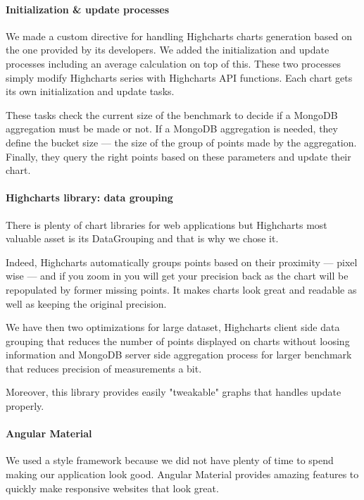 \documentclass[a4paper,11pt]{report}
\begin{document}
\paragraph{Initialization \& update processes}

We made a custom directive for handling Highcharts charts generation based on the one provided by its developers. We added the initialization and update processes including an average calculation on top of this. These two processes simply modify Highcharts series with Highcharts API functions. Each chart gets its own initialization and update tasks.

These tasks check the current size of the benchmark to decide if a MongoDB aggregation must be made or not. If a MongoDB aggregation is needed, they define the bucket size --- the size of the group of points made by the aggregation. Finally, they query the right points based on these parameters and update their chart.

\paragraph{Highcharts library: data grouping}\label{data_grouping} There is plenty of chart libraries for web applications but Highcharts most valuable asset is its DataGrouping and that is why we chose it.

Indeed, Highcharts automatically groups points based on their proximity --- pixel wise --- and if you zoom in you will get your precision back as the chart will be repopulated by former missing points. It makes charts look great and readable as well as keeping the original precision.

We have then two optimizations for large dataset, Highcharts client side data grouping that reduces the number of points displayed on charts without loosing information and MongoDB server side aggregation process for larger benchmark that reduces precision of measurements a bit.

Moreover, this library provides easily "tweakable" graphs that handles update properly.

\paragraph{Angular Material} We used a style framework because we did not have plenty of time to spend making our application look good. Angular Material provides amazing features to quickly make responsive websites that look great.
\end{document}
